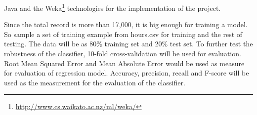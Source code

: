 \documentclass[12pt]{article}
\newcommand{\bibfile}{GroupProject}
\newcommand{\ci}[1]{\cite{#1}}
\begin{document}
Java and the
Weka\footnote{\href{http://www.cs.waikato.ac.nz/ml/weka/}{http://www.cs.waikato.ac.nz/ml/weka/}}
technologies for the implementation of the project.



Since the total record is more than 17,000, it is big enough for training a
model. So sample a set of training example from hours.csv for training and the
rest of testing. The data will be as 80\% training set and 20\% test set. To
further test the robustness of the classifier, 10-fold cross-validation will be
used for evaluation. Root Mean Squared Error and Mean Absolute Error would be
used as measure for evaluation of regression model\ci{modreg}. Accuracy,
precision, recall and F-score will be used as the measurement for the
evaluation of the classifier.\ci{liu2007web}



\end{document}
